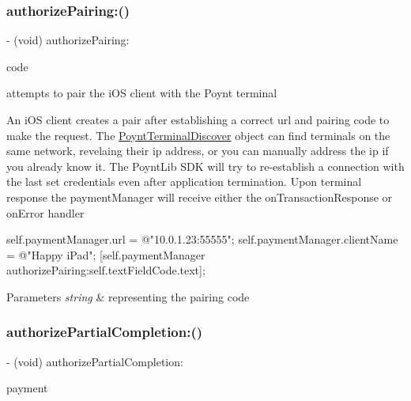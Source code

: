 \subsubsection{\texorpdfstring{authorize\+Pairing\+:()}{authorizePairing:()}}
{\footnotesize\ttfamily -\/ (void) authorize\+Pairing\+: \begin{DoxyParamCaption}\item[{(N\+S\+String $\ast$)}]{code }\end{DoxyParamCaption}}



attempts to pair the i\+OS client with the Poynt terminal 

An i\+OS client creates a pair after establishing a correct url and pairing code to make the request. The \hyperlink{interface_poynt_terminal_discover}{Poynt\+Terminal\+Discover} object can find terminals on the same network, revelaing their ip address, or you can manually address the ip if you already know it. The Poynt\+Lib S\+DK will try to re-\/establish a connection with the last set credentials even after application termination. Upon terminal response the payment\+Manager will receive either the on\+Transaction\+Response or on\+Error handler


\begin{DoxyCode}
\textcolor{keyword}{self}.paymentManager.url = \textcolor{stringliteral}{@"10.0.1.23:55555"};
\textcolor{keyword}{self}.paymentManager.clientName = \textcolor{stringliteral}{@"Happy iPad"};
[\textcolor{keyword}{self}.paymentManager authorizePairing:\textcolor{keyword}{self}.textFieldCode.text];
\end{DoxyCode}



\begin{DoxyParams}{Parameters}
{\em string} & representing the pairing code \\
\hline
\end{DoxyParams}
\hypertarget{interface_poynt_p_o_s_connection_manager_a9ddd4dfbae869bf65611b03472140b8e}{}\label{interface_poynt_p_o_s_connection_manager_a9ddd4dfbae869bf65611b03472140b8e} 
\subsubsection{\texorpdfstring{authorize\+Partial\+Completion\+:()}{authorizePartialCompletion:()}}
{\footnotesize\ttfamily -\/ (void) authorize\+Partial\+Completion\+: \begin{DoxyParamCaption}\item[{(\hyperlink{interface_poynt_payment_object}{Poynt\+Payment\+Object} $\ast$)}]{payment }\end{DoxyParamCaption}}



